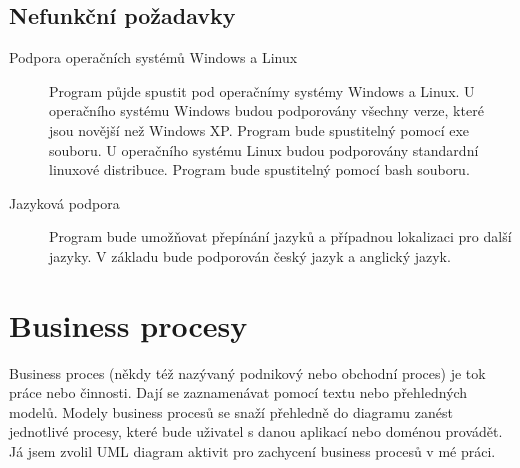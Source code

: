 \documentclass[thesis=B,czech]{resources/FITthesis}[2012/06/26]
\begin{document}
\subsection{Nefunkční požadavky}\label{sec:funkcni_pozadavky}
\begin{description}

\item[Podpora operačních systémů Windows a Linux] Program půjde spustit pod operačnímy systémy Windows a Linux. U operačního systému Windows budou podporovány všechny verze, které jsou novější než Windows XP. Program bude spustitelný pomocí exe souboru. U operačního systému Linux budou podporovány standardní linuxové distribuce. Program bude spustitelný pomocí bash souboru.

\item[Jazyková podpora] Program bude umožňovat přepínání jazyků a případnou lokalizaci pro další jazyky. V základu bude podporován český jazyk a anglický jazyk.
\end{description}
	\section{Business procesy}
Business proces (někdy též nazývaný podnikový nebo obchodní proces) je tok práce nebo činnosti. Dají se zaznamenávat pomocí textu nebo přehledných modelů. Modely business procesů se snaží přehledně do diagramu zanést jednotlivé procesy, které bude uživatel s danou aplikací nebo doménou provádět. Já jsem zvolil UML diagram aktivit pro zachycení business procesů v mé práci.
\end{document}
